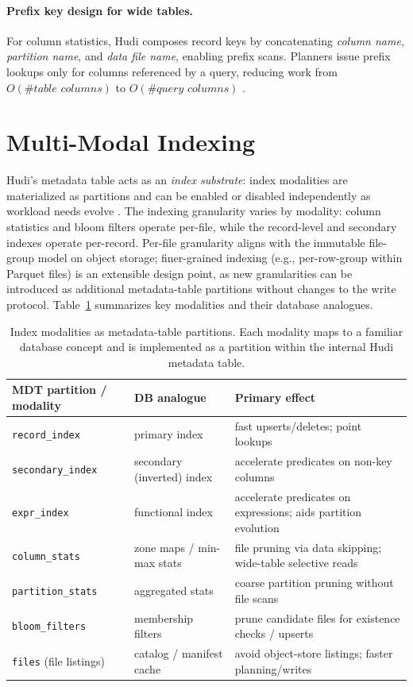 \documentclass[sigconf]{acmart}
\begin{document}
\paragraph{Prefix key design for wide tables.}
For column statistics, Hudi composes record keys by concatenating \emph{column name}, \emph{partition name}, and \emph{data file name}, enabling prefix scans.
Planners issue prefix lookups only for columns referenced by a query, reducing work from $O(\#\textit{table columns})$ to $O(\#\textit{query columns})$ \cite{onehouse-mmi}.

\section{Multi-Modal Indexing}
\label{sec:modalities}

Hudi's metadata table acts as an \emph{index substrate}: index modalities are materialized as partitions and can be enabled or disabled independently as workload needs evolve \cite{hudi-metadata,hudi-indexes}.
The indexing granularity varies by modality: column statistics and bloom filters operate per-file, while the record-level and secondary indexes operate per-record.
Per-file granularity aligns with the immutable file-group model on object storage; finer-grained indexing (e.g., per-row-group within Parquet files) is an extensible design point, as new granularities can be introduced as additional metadata-table partitions without changes to the write protocol.
Table~\ref{tab:modalities} summarizes key modalities and their database analogues.

\begin{table}[t]
\caption{Index modalities as metadata-table partitions. Each modality maps to a familiar database concept and is implemented as a partition within the internal Hudi metadata table.}
\label{tab:modalities}
\centering
\scriptsize
\begin{tabular}{@{}lll@{}}
\toprule
\textbf{MDT partition / modality} & \textbf{DB analogue} & \textbf{Primary effect} \\
\midrule
\texttt{record\_index} & primary index & fast upserts/deletes; point lookups \\
\texttt{secondary\_index} & secondary (inverted) index & accelerate predicates on non-key columns \\
\texttt{expr\_index} & functional index & accelerate predicates on expressions; aids partition evolution \\
\texttt{column\_stats} & zone maps / min-max stats & file pruning via data skipping; wide-table selective reads \\
\texttt{partition\_stats} & aggregated stats & coarse partition pruning without file scans \\
\texttt{bloom\_filters} & membership filters & prune candidate files for existence checks / upserts \\
\texttt{files} (file listings) & catalog / manifest cache & avoid object-store listings; faster planning/writes \\
\bottomrule
\end{tabular}
\end{table}
\end{document}
